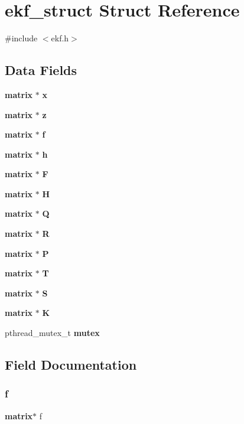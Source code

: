 \section{ekf\+\_\+struct Struct Reference}
\label{structekf__struct}


{\ttfamily \#include $<$ekf.\+h$>$}

\subsection*{Data Fields}
\begin{DoxyCompactItemize}
\item 
\textbf{ matrix} $\ast$ \textbf{ x}
\item 
\textbf{ matrix} $\ast$ \textbf{ z}
\item 
\textbf{ matrix} $\ast$ \textbf{ f}
\item 
\textbf{ matrix} $\ast$ \textbf{ h}
\item 
\textbf{ matrix} $\ast$ \textbf{ F}
\item 
\textbf{ matrix} $\ast$ \textbf{ H}
\item 
\textbf{ matrix} $\ast$ \textbf{ Q}
\item 
\textbf{ matrix} $\ast$ \textbf{ R}
\item 
\textbf{ matrix} $\ast$ \textbf{ P}
\item 
\textbf{ matrix} $\ast$ \textbf{ T}
\item 
\textbf{ matrix} $\ast$ \textbf{ S}
\item 
\textbf{ matrix} $\ast$ \textbf{ K}
\item 
pthread\+\_\+mutex\+\_\+t \textbf{ mutex}
\end{DoxyCompactItemize}


\subsection{Field Documentation}
\mbox{\label{structekf__struct_a81c4c8a6ed64828d4c2f7cccb2794ebb}} 
\subsubsection{f}
{\footnotesize\ttfamily \textbf{ matrix}$\ast$ f}

\mbox{\label{structekf__struct_a9cba4c914ccb68d2fa56a599049b5d88}} 
